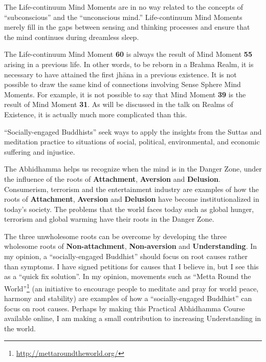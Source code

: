 The Life-continuum Mind Moments are in no way related to the concepts of “subconscious” and the “unconscious mind.” Life-continuum Mind Moments merely fill in the gaps between sensing and thinking processes and ensure that the mind continues during dreamless sleep. 


The Life-continuum Mind Moment \textbf{60} is always the result of Mind Moment \textbf{55} arising in a previous life. In other words, to be reborn in a Brahma Realm, it is necessary to have attained the first jhāna in a previous existence. It is not possible to draw the same kind of connections involving Sense Sphere Mind Moments. For example, it is not possible to say that Mind Moment \textbf{39} is the result of Mind Moment \textbf{31}. As will be discussed in the talk on Realms of Existence, it is actually much more complicated than this.


“Socially-engaged Buddhists” seek ways to apply the insights from the Suttas and meditation practice to situations of social, political, environmental, and economic suffering and injustice.

The Abhidhamma helps us recognize when the mind is in the Danger Zone, under the influence of the roots of \textbf{Attachment}, \textbf{Aversion} and \textbf{Delusion}. Consumerism, terrorism and the entertainment industry are examples of how the roots of \textbf{Attachment}, \textbf{Aversion} and \textbf{Delusion} have become institutionalized in today's society. The problems that the world faces today such as global hunger, terrorism and global warming have their roots in the Danger Zone.

The three unwholesome roots can be overcome by developing the three wholesome roots of \textbf{Non-attachment}, \textbf{Non-aversion} and \textbf{Understanding}. In my opinion, a “socially-engaged Buddhist” should focus on root causes rather than symptoms. I have signed petitions for causes that I believe in, but I see this as a “quick fix solution”. In my opinion, movements such as “Metta Round the World”\footnote{\url{http://mettaroundtheworld.org/}} (an initiative to encourage people to meditate and pray for world peace, harmony and stability) are examples of how a “socially-engaged Buddhist” can focus on root causes. Perhaps by making this Practical Abhidhamma Course available online, I am making a small contribution to increasing Understanding in the world. \smiley

